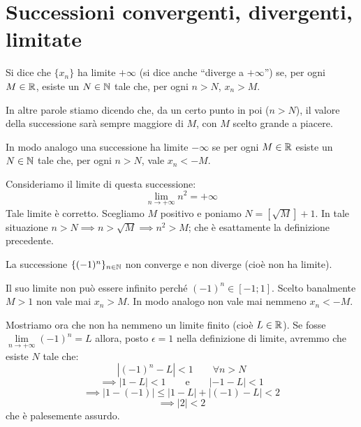 \section{Successioni convergenti, divergenti, limitate}

\begin{definition}
Si dice che $\{x_n\}$ ha limite $+\infty$ (si dice anche ``diverge a $+\infty$'') se, per ogni $M \in \mathbb R$, esiste un $N \in \mathbb N$ tale che, per ogni $n > N$, $x_n > M$.
\end{definition}

In altre parole stiamo dicendo che, da un certo punto in poi ($n > N$), il valore della successione sarà sempre maggiore di $M$, con $M$ scelto grande a piacere.

In modo analogo una successione ha limite $-\infty$ se per ogni $M \in \mathbb R$ esiste un $N \in \mathbb N$ tale che, per ogni $n > N$, vale $x_n < -M$.

\begin{example}
Consideriamo il limite di questa successione:
\begin{equation*}
\lim_{n \to +\infty} n^2 = +\infty
\end{equation*}
Tale limite è corretto. Scegliamo $M$ positivo e poniamo $N = [\sqrt{M}] + 1$. In tale situazione $n > N \implies n > \sqrt{M} \implies n^2 > M$; che è esattamente la definizione precedente.
\end{example}

\begin{example}
La successione $\{(-1)^n\}_{n \in \mathbb N}$ non converge e non diverge (cioè non ha limite).

Il suo limite non può essere infinito perché $(-1)^n \in [-1; 1]$. Scelto banalmente $M > 1$ non vale mai $x_n > M$. In modo analogo non vale mai nemmeno $x_n < -M$.

Mostriamo ora che non ha nemmeno un limite finito (cioè $L \in \mathbb R$). Se fosse $\lim\limits_{n \to +\infty} (-1)^n = L$ allora, posto $\epsilon = 1$ nella definizione di limite, avremmo che esiste $N$ tale che:
\begin{equation*}
| (-1)^n - L | < 1 \qquad \forall n > N
\end{equation*}
\begin{equation*}
\implies |1 - L| < 1 \qquad \text{e} \qquad |-1 - L| < 1
\end{equation*}
\begin{equation*}
\implies |1 - (-1)| \le |1 - L| + |(-1)-L| < 2
\end{equation*}
\begin{equation*}
\implies |2| < 2
\end{equation*}
che è palesemente assurdo.
\end{example}

